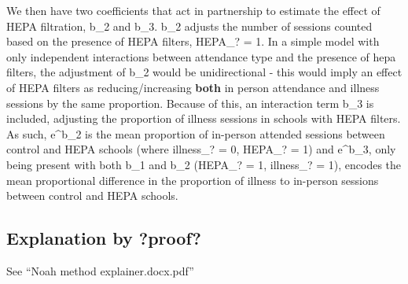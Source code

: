 \documentclass[11pt]{article}
\begin{document}
We then have two coefficients that act in partnership to estimate the
effect of HEPA filtration, b\_2 and b\_3. b\_2 adjusts the number of
sessions counted based on the presence of HEPA filters, HEPA\_? = 1. In
a simple model with only independent interactions between attendance
type and the presence of hepa filters, the adjustment of b\_2 would be
unidirectional - this would imply an effect of HEPA filters as
reducing/increasing \textbf{both} in person attendance and illness
sessions by the same proportion. Because of this, an interaction term
b\_3 is included, adjusting the proportion of illness sessions in
schools with HEPA filters. As such, e\^{}b\_2 is the mean proportion of
in-person attended sessions between control and HEPA schools (where
illness\_? = 0, HEPA\_? = 1) and e\^{}b\_3, only being present with both
b\_1 and b\_2 (HEPA\_? = 1, illness\_? = 1), encodes the mean
proportional difference in the proportion of illness to in-person
sessions between control and HEPA schools.

\hypertarget{explanation-by-proof}{%
\subsection{Explanation by ?proof?}\label{explanation-by-proof}}

See ``Noah method explainer.docx.pdf''
\end{document}
